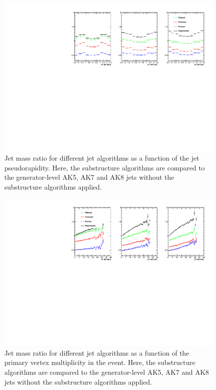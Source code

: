 \begin{figure}[!htb]
\centering
\includegraphics[width=1.0\textwidth]{figs/massRatioOvGen_vsEta.pdf}
\caption{Jet mass ratio for different jet algorithms as a function of the jet pseudorapidity. Here, the substructure algorithms are compared to the
  generator-level AK5, AK7 and AK8 jets without the substructure algorithms applied.}
\label{figs:massRatiovsEta}
\end{figure}

\begin{figure}[!htb]
\centering
\includegraphics[width=1.0\textwidth]{figs/massRatioOvGen_vsNV.pdf}
\caption{Jet mass ratio for different jet algorithms as a function of the primary vertex multiplicity in the event. Here, the  substructure algorithms are compared to the
  generator-level AK5, AK7 and AK8 jets without the substructure algorithms applied.}
\label{figs:massRatiovsNV}
\end{figure}


